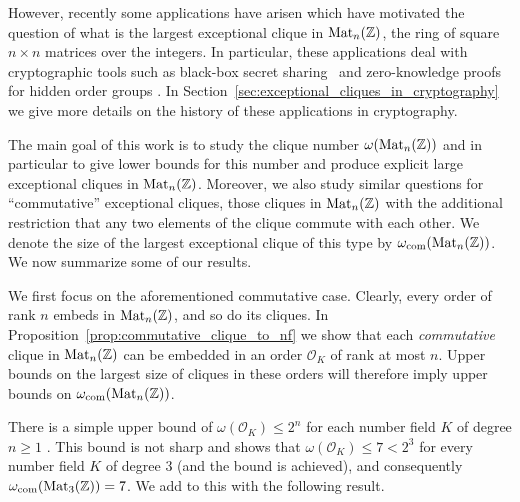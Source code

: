\documentclass{amsart}
\theoremstyle{plain}
\theoremstyle{definition}
\newcommand{\Z}{\ensuremath{\mathbb{Z}}}
\begin{document}

However, recently some applications have arisen which have motivated the question of what is the largest exceptional clique in $\textup{Mat}_n(\Z)$, the ring of square $n\times n$ matrices over the integers. In particular, these applications deal with cryptographic tools such as black-box secret sharing~\cite{CF02, CFS05} and zero-knowledge proofs for hidden order groups \cite{CD09, BC24}. In Section~\ref{sec:exceptional_cliques_in_cryptography} we give more details on the history of these applications in cryptography.

The main goal of this work is to study the clique number $\omega(\textup{Mat}_n(\Z))$ and in particular
to give lower bounds for this number and produce explicit large exceptional cliques in \(\textup{Mat}_n(\Z)\). Moreover, we also study similar questions for ``commutative'' exceptional cliques, those cliques in \(\textup{Mat}_n(\Z)\) with the additional restriction that any two elements of the clique commute with each other. We denote the size of the largest exceptional clique of this type by $\omega_{\textup{com}}(\textup{Mat}_n(\Z))$.\\

We now summarize some of our results. 

We first focus on the aforementioned commutative case. Clearly, every order of rank \(n\) embeds in \(\textup{Mat}_n(\Z)\), and so do its cliques. In Proposition~\ref{prop:commutative_clique_to_nf} we show that each  \textit{commutative} clique in \(\textup{Mat}_n(\Z)\) can be embedded in an order $\mathcal{O}_K$ of rank at most \(n\). Upper bounds on the largest size of cliques in these orders will therefore imply upper bounds on $\omega_{\textup{com}}(\textup{Mat}_n(\Z))$.

There is a simple upper bound of \(\omega(\mathcal{O}_K)\leq 2^n\) for each number field \(K\) of degree \(n\geq 1\) \cite{Lenstra}. This bound is not sharp and \cite{Martinet} shows that \(\omega(\mathcal{O}_K)\leq 7 <2^3\) for every number field \(K\) of degree $3$ (and the bound is achieved), and consequently $\omega_{\textup{com}}(\textup{Mat}_3(\Z))=7$. We add to this with the following result.
\end{document}
